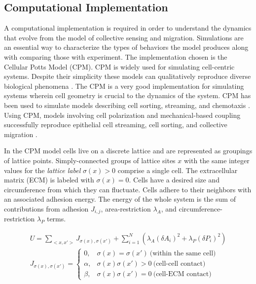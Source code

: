 \documentclass[a4paper]{article}
\begin{document}
\subsection{Computational Implementation}

A computational implementation is required in order to understand the dynamics that evolve from the model of collective sensing and migration. Simulations are an essential way to characterize the types of behaviors the model produces along with comparing those with experiment. The implementation chosen is the Cellular Potts Model (CPM). CPM is widely used for simulating cell-centric systems. Despite their simplicity these models can qualitatively reproduce diverse biological phenomena \cite{graner1992simulation,maree2007cellular,swat2012multi}. The CPM is a very good implementation for simulating systems wherein cell geometry is crucial to the dynamics of the system. CPM has been used to simulate models describing cell sorting, streaming, and chemotaxis \cite{maclaren2015models}. Using CPM, models involving cell polarization and mechanical-based coupling successfully reproduce epithelial cell streaming, cell sorting, and collective migration \cite{kabla2012collective,szabo2010collective}.

In the CPM model cells live on a discrete lattice and are represented as groupings of lattice points. Simply-connected groups of lattice sites $x$ with the same integer values for the \textit{lattice label} $\sigma(x)>0$ comprise a single cell. The extracellular matrix (ECM) is labeled with $\sigma(x)=0$. Cells have a desired size and circumference from which they can fluctuate. Cells adhere to their neighbors with an associated adhesion energy. The energy of the whole system is the sum of contributions from adhesion $J_{i,j}$, area-restriction $\lambda_A$, and circumference-restriction $\lambda_P$ terms.

\begin{gather}
    U = \sum_{<x,x'>} J_{\sigma(x),\sigma(x')} + \sum_{i=1}^N \left( \lambda_A (\delta A_i)^2 + \lambda_P (\delta P_i)^2 \right) \\
    J_{\sigma(x),\sigma(x')} =
    \begin{cases}
        0, &\sigma(x)=\sigma(x') \ \text{(within the same cell)} \\
        \alpha, &\sigma(x)\sigma(x')>0 \ \text{(cell-cell contact)} \\
        \beta, &\sigma(x)\sigma(x')=0 \ \text{(cell-ECM contact)}
    \end{cases}
\end{gather}
\end{document}
